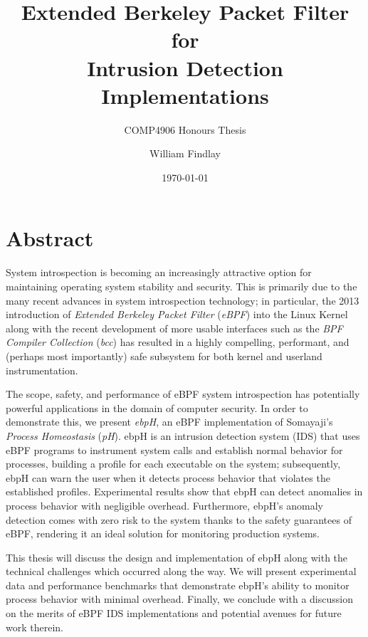 \documentclass[
  12pt]{findlay}
\title{Extended Berkeley Packet Filter for\\
Intrusion Detection Implementations}
\subtitle{COMP4906 Honours Thesis}
\author{William Findlay}
\date{\today}
\begin{document}
\maketitle

\pagestyle{fancy}

\thispagestyle{empty}

\onehalfspacing

\clearpage
{}
\section*{Abstract}

System introspection is becoming an increasingly attractive option for
maintaining operating system stability and security. This is primarily
due to the many recent advances in system introspection technology; in
particular, the 2013 introduction of \emph{Extended Berkeley Packet
Filter} (\emph{eBPF}) into the Linux Kernel \autocite{starovoitov13}
along with the recent development of more usable interfaces such as the
\emph{BPF Compiler Collection} (\emph{bcc}) \autocite{bcc} has resulted
in a highly compelling, performant, and (perhaps most importantly) safe
subsystem for both kernel and userland instrumentation.

The scope, safety, and performance of eBPF system introspection has
potentially powerful applications in the domain of computer security. In
order to demonstrate this, we present \emph{ebpH}, an eBPF
implementation of Somayaji's \autocite{soma02} \emph{Process
Homeostasis} (\emph{pH}). ebpH is an intrusion detection system (IDS)
that uses eBPF programs to instrument system calls and establish normal
behavior for processes, building a profile for each executable on the
system; subsequently, ebpH can warn the user when it detects process
behavior that violates the established profiles. Experimental results
show that ebpH can detect anomalies in process behavior with negligible
overhead. Furthermore, ebpH's anomaly detection comes with zero risk to
the system thanks to the safety guarantees of eBPF, rendering it an
ideal solution for monitoring production systems.

This thesis will discuss the design and implementation of ebpH along
with the technical challenges which occurred along the way. We will
present experimental data and performance benchmarks that demonstrate
ebpH's ability to monitor process behavior with minimal overhead.
Finally, we conclude with a discussion on the merits of eBPF IDS
implementations and potential avenues for future work therein.
\end{document}
